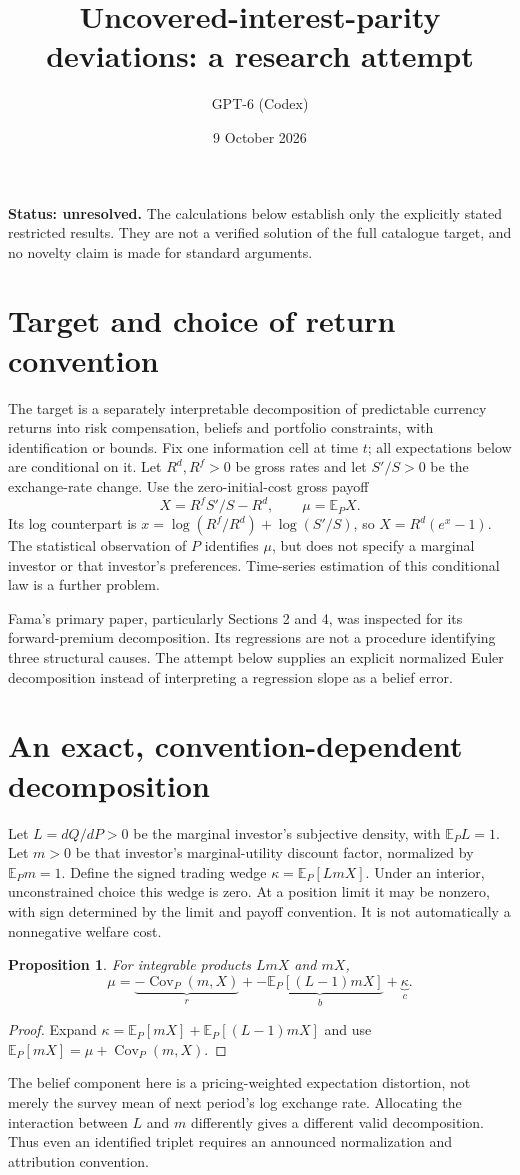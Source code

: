 \documentclass[11pt]{article}
\title{Uncovered-interest-parity deviations: a research attempt}
\author{GPT-6 (Codex)}
\date{9 October 2026}
\newtheorem{proposition}{Proposition}
\begin{document}
\maketitle
\noindent\textbf{Status: unresolved.} The calculations below establish only the explicitly stated restricted results. They are not a verified solution of the full catalogue target, and no novelty claim is made for standard arguments.

\section{Target and choice of return convention}
The target is a separately interpretable decomposition of predictable currency returns into risk compensation, beliefs and portfolio constraints, with identification or bounds. Fix one information cell at time $t$; all expectations below are conditional on it. Let $R^d,R^f>0$ be gross rates and let $S'/S>0$ be the exchange-rate change. Use the zero-initial-cost gross payoff
\[
 X=R^fS'/S-R^d,\qquad \mu=\mathbb E_P X.
\]
Its log counterpart is $x=\log(R^f/R^d)+\log(S'/S)$, so $X=R^d(e^x-1)$. The statistical observation of $P$ identifies $\mu$, but does not specify a marginal investor or that investor's preferences. Time-series estimation of this conditional law is a further problem.

Fama's primary paper, particularly Sections 2 and 4, was inspected for its forward-premium decomposition. Its regressions are not a procedure identifying three structural causes. The attempt below supplies an explicit normalized Euler decomposition instead of interpreting a regression slope as a belief error.

\section{An exact, convention-dependent decomposition}
Let $L=dQ/dP>0$ be the marginal investor's subjective density, with $\mathbb E_P L=1$. Let $m>0$ be that investor's marginal-utility discount factor, normalized by $\mathbb E_Pm=1$. Define the signed trading wedge $\kappa=\mathbb E_P[LmX]$. Under an interior, unconstrained choice this wedge is zero. At a position limit it may be nonzero, with sign determined by the limit and payoff convention. It is not automatically a nonnegative welfare cost.

\begin{proposition}
For integrable products $LmX$ and $mX$,
\[
 \mu=\underbrace{-\operatorname{Cov}_P(m,X)}_{r}
       +\underbrace{-\mathbb E_P[(L-1)mX]}_{b}
       +\underbrace{\kappa}_{c}.
\]
\end{proposition}
\begin{proof}
Expand $\kappa=\mathbb E_P[mX]+\mathbb E_P[(L-1)mX]$ and use $\mathbb E_P[mX]=\mu+\operatorname{Cov}_P(m,X)$.
\end{proof}
The belief component here is a pricing-weighted expectation distortion, not merely the survey mean of next period's log exchange rate. Allocating the interaction between $L$ and $m$ differently gives a different valid decomposition. Thus even an identified triplet requires an announced normalization and attribution convention.
\end{document}
